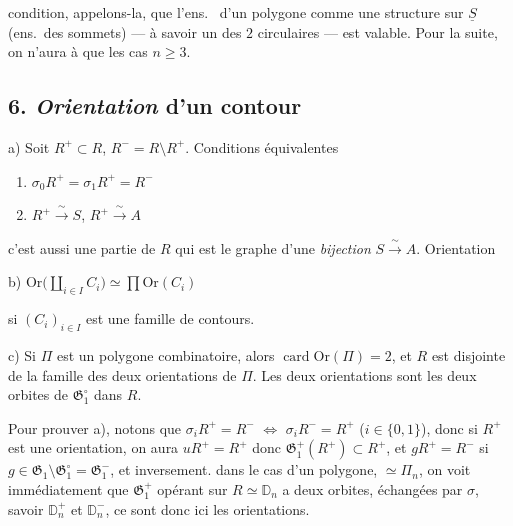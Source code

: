 \documentclass[11pt,a4paper]{article}
\begin{document}
condition, appelons-la, que l'ens.\ \ill{} d'un polygone comme une structure sur $\underline{S}$ (ens.\ des sommets) --- à savoir un \ill{} des $2$ \ill{} circulaires --- est valable. Pour la suite, on n'aura à  que les cas $n \geq 3$.

\subsection{6. \emph{Orientation} d'un contour}

a) Soit $R^{+} \subset R$, \struck{\ill{}} $R^{-} = R \setminus R^{+}$. Conditions équivalentes
\begin{enumerate}
  \item[a)] $\sigma_0 R^{+} = \sigma_1 R^{+} = R^{-}$
  \item[b)] $R^{+} \xrightarrow{\ \sim\ } S$, \quad $R^{+} \xrightarrow{\ \sim\ } A$
\end{enumerate}
c'est aussi une partie  de $R$ qui est le graphe d'une \emph{bijection} $S \xrightarrow{\ \sim\ } A$. Orientation \struck{\ill{}}   \add{\ill{} $\Pi$ \ill{}}

b) \quad $\mathrm{Or}\bigl(\coprod_{i \in I} C_i\bigr) \simeq \prod \mathrm{Or}(C_i)$

\quad si $(C_i)_{i \in I}$ est une famille de contours.

c) Si $\Pi$ est un polygone combinatoire, alors $\operatorname{card} \mathrm{Or}(\Pi) = 2$, et $R$ est  \struck{\ill{}} disjointe de la \struck{\ill{}} famille des deux orientations  de $\Pi$.  Les deux orientations sont les deux orbites de $\mathfrak{G}_1^{\circ}$ dans $R$.

Pour prouver a), notons que $\sigma_i R^{+} = R^{-}$ $\Longleftrightarrow$ $\sigma_i R^{-} = R^{+}$ ($i \in \{0,1\}$), donc si $R^{+}$ est une orientation, on aura $uR^{+} = R^{+}$ donc $\mathfrak{G}_1^{+}(R^{+}) \subset R^{+}$, et $gR^{+} = R^{-}$ si $g \in \mathfrak{G}_1 \setminus \mathfrak{G}_1^{\circ} = \mathfrak{G}_1^{-}$,  et inversement. \ill{} dans le cas d'un polygone, \struck{\ill{}} $\simeq \Pi_n$, on voit immédiatement que $\mathfrak{G}_1^{+}$ opérant sur $R \simeq \mathbb{D}_n$ a  deux orbites,   échangées par $\sigma$, savoir $\mathbb{D}_n^{+}$ et $\mathbb{D}_n^{-}$, ce sont donc ici les orientations.
\end{document}
